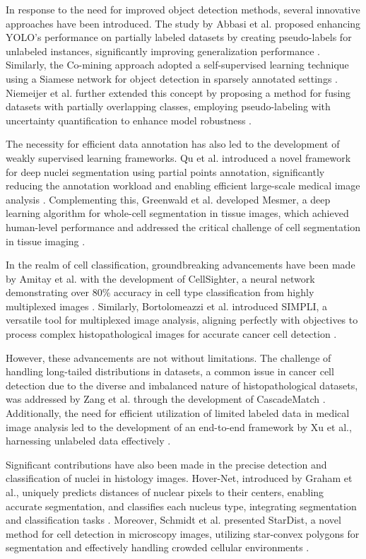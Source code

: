 \documentclass[anon]{midl} %
\begin{document}
In response to the need for improved object detection methods, several innovative approaches have been introduced. The study by Abbasi et al. proposed enhancing YOLO's performance on partially labeled datasets by creating pseudo-labels for unlabeled instances, significantly improving generalization performance \cite{abbasi2020self}. Similarly, the Co-mining approach adopted a self-supervised learning technique using a Siamese network for object detection in sparsely annotated settings \cite{wang2021co}. Niemeijer et al. further extended this concept by proposing a method for fusing datasets with partially overlapping classes, employing pseudo-labeling with uncertainty quantification to enhance model robustness \cite{niemeijer2023approach}.

The necessity for efficient data annotation has also led to the development of weakly supervised learning frameworks. Qu et al. introduced a novel framework for deep nuclei segmentation using partial points annotation, significantly reducing the annotation workload and enabling efficient large-scale medical image analysis \cite{qu2020weakly}. Complementing this, Greenwald et al. developed Mesmer, a deep learning algorithm for whole-cell segmentation in tissue images, which achieved human-level performance and addressed the critical challenge of cell segmentation in tissue imaging \cite{greenwald2022whole}.

In the realm of cell classification, groundbreaking advancements have been made by Amitay et al. with the development of CellSighter, a neural network demonstrating over 80\% accuracy in cell type classification from highly multiplexed images \cite{amitay2023cellsighter}. Similarly, Bortolomeazzi et al. introduced SIMPLI, a versatile tool for multiplexed image analysis, aligning perfectly with objectives to process complex histopathological images for accurate cancer cell detection \cite{bortolomeazzi2022simpli}.

However, these advancements are not without limitations. The challenge of handling long-tailed distributions in datasets, a common issue in cancer cell detection due to the diverse and imbalanced nature of histopathological datasets, was addressed by Zang et al. through the development of CascadeMatch \cite{zang2023semi}. Additionally, the need for efficient utilization of limited labeled data in medical image analysis led to the development of an end-to-end framework by Xu et al., harnessing unlabeled data effectively \cite{xu2021end}.

Significant contributions have also been made in the precise detection and classification of nuclei in histology images. Hover-Net, introduced by Graham et al., uniquely predicts distances of nuclear pixels to their centers, enabling accurate segmentation, and classifies each nucleus type, integrating segmentation and classification tasks \cite{graham2019hover}. Moreover, Schmidt et al. presented StarDist, a novel method for cell detection in microscopy images, utilizing star-convex polygons for segmentation and effectively handling crowded cellular environments \cite{schmidt2018cell}.
\end{document}
